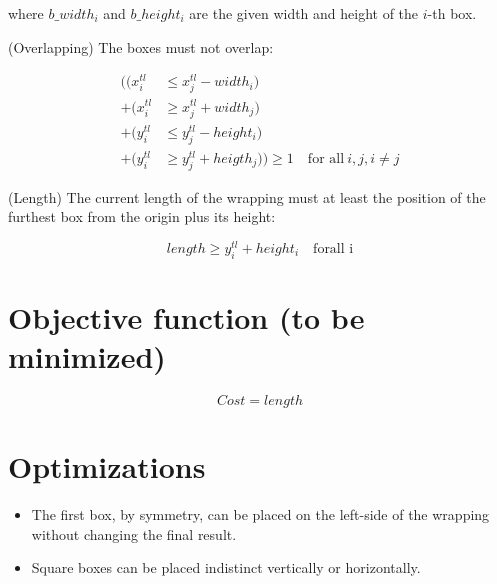 \documentclass[12pt, a4paper]{article} %
\begin{document}
where $b\_width_i$ and $b\_height_i$ are the given width and height of the $i$-th box.

(Overlapping) The boxes must not overlap:

\begin{equation}\label{eq:three}
  \begin{split}
    ((x^{tl}_i &\leq x^{tl}_j - width_i)\\
    + (x^{tl}_i &\geq x^{tl}_j + width_j)\\
    + (y^{tl}_i &\leq y^{tl}_j - height_i)\\
    + (y^{tl}_i &\geq y^{tl}_j + heigth_j)) \geq 1 \quad \text{for all} \ i, j, i \neq j
  \end{split}
\end{equation}

(Length) The current length of the wrapping must at least the position of the furthest box from the origin plus its height:

\begin{equation}\label{eq:four}
  length \geq y^{tl}_i + height_i \quad \text{forall i}
\end{equation}



\section{Objective function (to be minimized)}\label{variables}

\begin{equation}\label{eq:four}
  Cost = length
\end{equation}



\section{Optimizations}\label{optimizations}

\begin{itemize}
  \item The first box, by symmetry, can be placed on the left-side of the wrapping without changing the final result.
  \item Square boxes can be placed indistinct vertically or horizontally.
\end{itemize}

\end{document}
